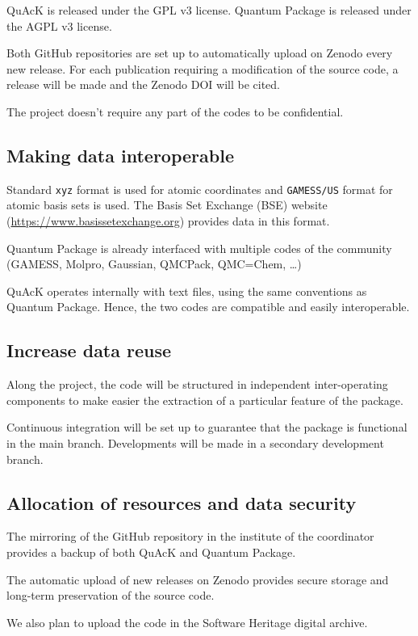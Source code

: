 \documentclass[12pt,onecolumn,notitlepage]{revtex4-1}
\begin{document}
QuAcK is released under the GPL v3 license.
Quantum Package is released under the AGPL v3 license.

Both GitHub repositories are set up to automatically upload on
Zenodo every new release. For each publication requiring a
modification of the source code, a release will be made and the
Zenodo DOI will be cited.

The project doesn't require any part of the codes to be confidential.

\subsection{Making data interoperable}

Standard \texttt{xyz} format is used for atomic coordinates and \texttt{GAMESS/US}
format for atomic basis sets is used. The Basis Set Exchange (BSE)
website (\url{https://www.basissetexchange.org}) provides data in this
format.

Quantum Package is already interfaced with multiple codes of the
community (GAMESS, Molpro, Gaussian, QMCPack, QMC=Chem, \ldots{})

QuAcK operates internally with text files, using the same
conventions as Quantum Package. Hence, the two codes are
compatible and easily interoperable.

\subsection{Increase data reuse}

Along the project, the code will be structured in independent
inter-operating components to make easier the extraction of a
particular feature of the package.

Continuous integration will be set up to guarantee that the package is
functional in the main branch. Developments will be made in a
secondary development branch.

\subsection{Allocation of resources and data security}

The mirroring of the GitHub repository in the institute of the
coordinator provides a backup of both QuAcK and Quantum Package.

The automatic upload of new releases on Zenodo provides secure storage
and long-term preservation of the source code.

We also plan to upload the code in the Software Heritage digital
archive.
\end{document}
